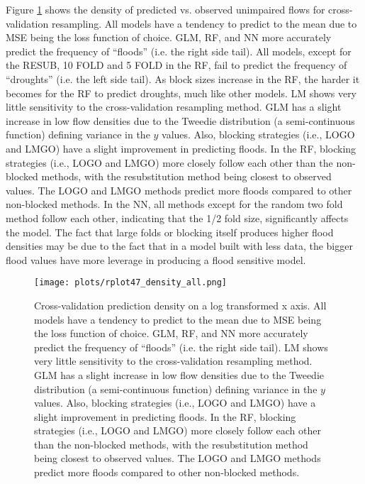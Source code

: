 Figure \ref{fig:modelscvdensity} shows the density of predicted vs. observed unimpaired flows for cross-validation resampling. All models have a tendency to predict to the mean due to MSE being the loss function of choice. GLM, RF, and NN more accurately predict the frequency of ``floods'' (i.e. the right side tail). All models, except for the RESUB, 10 FOLD and 5 FOLD in the RF, fail to predict the frequency of ``droughts'' (i.e. the left side tail). As block sizes increase in the RF, the harder it becomes for the RF to predict droughts, much like other models. LM shows very little sensitivity to the cross-validation resampling method. GLM has a slight increase in low flow densities due to the Tweedie distribution (a semi-continuous function) defining variance in the $y$ values. Also, blocking strategies (i.e., LOGO and LMGO) have a slight improvement in predicting floods. In the RF, blocking strategies (i.e., LOGO and LMGO) more closely follow each other than the non-blocked methods, with the resubstitution method being closest to observed values. The LOGO and LMGO methods predict more floods compared to other non-blocked methods. In the NN, all methods except for the random two fold method follow each other, indicating that the 1/2 fold size, significantly affects the model. The fact that large folds or blocking itself produces higher flood densities may be due to the fact that in a model built with less data, the bigger flood values have more leverage in producing a flood sensitive model. 

\begin{figure}
  	\centering
 	\texttt{[image: plots/rplot47\_density\_all.png]}
	\caption[Cross-validation prediction density on a log transformed x axis.]{Cross-validation prediction density on a log transformed x axis. All models have a tendency to predict to the mean due to MSE being the loss function of choice. GLM, RF, and NN more accurately predict the frequency of ``floods'' (i.e. the right side tail). LM shows very little sensitivity to the cross-validation resampling method. GLM has a slight increase in low flow densities due to the Tweedie distribution (a semi-continuous function) defining variance in the $y$ values. Also, blocking strategies (i.e., LOGO and LMGO) have a slight improvement in predicting floods. In the RF, blocking strategies (i.e., LOGO and LMGO) more closely follow each other than the non-blocked methods, with the resubstitution method being closest to observed values. The LOGO and LMGO methods predict more floods compared to other non-blocked methods.}
	\label{fig:modelscvdensity}
\end{figure}

